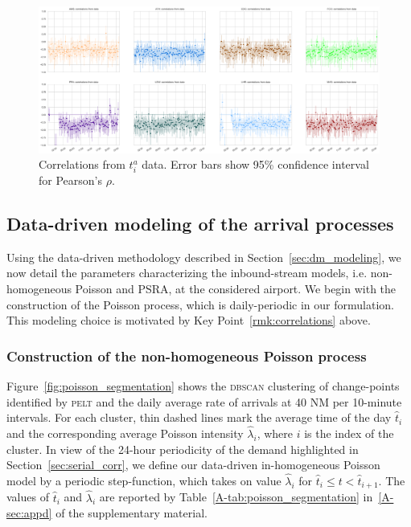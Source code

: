\documentclass[final,review]{elsarticle}
\makeatletter
\newcommand*{\ie}{i.e.\@\xspace}
\newcommand{\PELT}{\textsc{pelt}}
\newcommand{\DBSCAN}{\textsc{dbscan}}
\makeatother
\begin{document}
\begin{figure}
    \includegraphics[width=\textwidth]{correlations_true}
    \caption{Correlations from \(t^{a}_i\) data. Error bars show 95\% confidence interval for Pearson's \(\rho\).}
    \label{fig:correlations_true}
\end{figure}

\subsection{Data-driven modeling of the arrival processes}\label{sec:modeling}

Using the data-driven methodology described in Section~\ref{sec:dm_modeling}, we now detail the parameters characterizing the inbound-stream models, \ie{} non-homogeneous Poisson and \ac{PSRA}, at the considered airport.
We begin with the construction of the Poisson process, which is daily-periodic in our formulation.
This modeling choice is motivated by Key Point~\ref{rmk:correlations} above.

\subsubsection{Construction of the non-homogeneous Poisson process}\label{sec:pois}

Figure~\ref{fig:poisson_segmentation} shows the \DBSCAN{} clustering of change-points identified by \PELT{} and the daily average rate of arrivals at 40 NM per 10-minute  intervals.
For each cluster, thin dashed lines mark the average time of the day \(\hat{t}_i\) and the corresponding average Poisson intensity \(\hat{\lambda}_i\), where \(i\) is the index of the cluster.
In view of the 24-hour periodicity of the demand highlighted in Section~\ref{sec:serial_corr}, we define our data-driven in-homogeneous Poisson model by a periodic step-function, which takes on value \(\hat{\lambda}_i\) for \(\hat{t}_i \leq t < \hat{t}_{i+1}\).
The values of \(\hat{t}_i\) and \(\hat{\lambda}_i\) are reported by Table~\ref{A-tab:poisson_segmentation} in~\ref{A-sec:appd} of the supplementary material.
\end{document}
